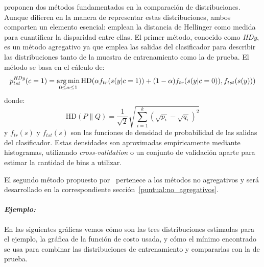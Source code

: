 \citet{gonzalez2013class} proponen dos métodos fundamentados en la comparación
de distribuciones. Aunque difieren en la manera de representar estas
distribuciones, ambos comparten un elemento esencial: emplean la distancia de
Hellinger como medida para cuantificar la disparidad entre ellas. El primer
método, conocido como {\it HDy}, es un método agregativo ya que emplea las
salidas del clasificador para describir las distribuciones tanto de la muestra
de entrenamiento como la de prueba. El método se basa en el cálculo de:
\begin{equation}\label{ecuacion:hdy}
    p^{\it{HDy}}_{tst}(c=1) = \operatorname*{arg\,min}_{0 \leq \alpha \leq 1}{\text{HD}}(\alpha f_{tr}{(s(y|c=1))}+(1-\alpha) f_{tr}{(s(y|c=0))}, f_{tst}{(s(y))})
\end{equation}
donde:
\begin{equation}\label{ecuacion:hd}
    {\text{HD}}(P \parallel Q)= \frac{1}{\sqrt{2}}{\sqrt {\sum _{i=1}^{k}({\sqrt {p_{i}}}-{\sqrt {q_{i}}})^{2}}}
\end{equation}
y $f_{tr}(s)$ y $f_{tst}(s)$ son las funciones de densidad de probabilidad de
las salidas del clasificador. Estas densidades son aproximadas empíricamente
mediante histogramas, utilizando {\it cross-validation\/} o un conjunto de
validación aparte para estimar la cantidad de bins a utilizar.

El segundo método propuesto por~\citet{gonzalez2013class} pertenece a los
métodos no agregativos y será desarrollado en la correspondiente
sección~\ref{puntual:no_agregativos}.

\paragraph{\it Ejemplo:\/} En las siguientes gráficas vemos cómo son las tres
distribuciones estimadas para el ejemplo, la gráfica de la función de costo
usada, y cómo el mínimo encontrado se usa para combinar las distribuciones de
entrenamiento y compararlas con la de prueba.

